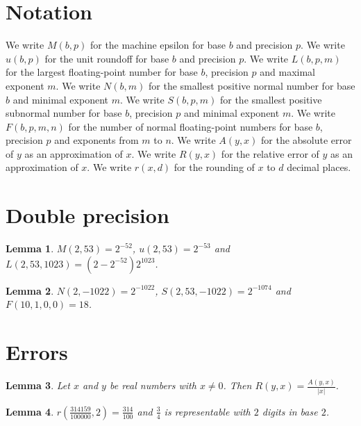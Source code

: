 \documentclass{article}
\newtheorem{lemma}{Lemma}
\begin{document}
\section{Notation}

We write $M(b,p)$ for the machine epsilon for base $b$ and precision $p$.
We write $u(b,p)$ for the unit roundoff for base $b$ and precision $p$.
We write $L(b,p,m)$ for the largest floating-point number for base $b$, precision $p$ and maximal exponent $m$.
We write $N(b,m)$ for the smallest positive normal number for base $b$ and minimal exponent $m$.
We write $S(b,p,m)$ for the smallest positive subnormal number for base $b$, precision $p$ and minimal exponent $m$.
We write $F(b,p,m,n)$ for the number of normal floating-point numbers for base $b$, precision $p$ and exponents from $m$ to $n$.
We write $A(y,x)$ for the absolute error of $y$ as an approximation of $x$.
We write $R(y,x)$ for the relative error of $y$ as an approximation of $x$.
We write $r(x,d)$ for the rounding of $x$ to $d$ decimal places.

\section{Double precision}

\begin{lemma}\label{double}
$M(2,53)=2^{-52}$, $u(2,53)=2^{-53}$ and $L(2,53,1023)=(2-2^{-52})2^{1023}$.
\end{lemma}

\begin{lemma}\label{tiny}
$N(2,-1022)=2^{-1022}$, $S(2,53,-1022)=2^{-1074}$ and $F(10,1,0,0)=18$.
\end{lemma}

\section{Errors}

\begin{lemma}\label{errors}
Let $x$ and $y$ be real numbers with $x\ne0$. Then $R(y,x)=\frac{A(y,x)}{|x|}$.
\end{lemma}

\begin{lemma}\label{rounding}
$r(\frac{314159}{100000},2)=\frac{314}{100}$ and $\frac34$ is representable with $2$ digits in base $2$.
\end{lemma}
\end{document}
